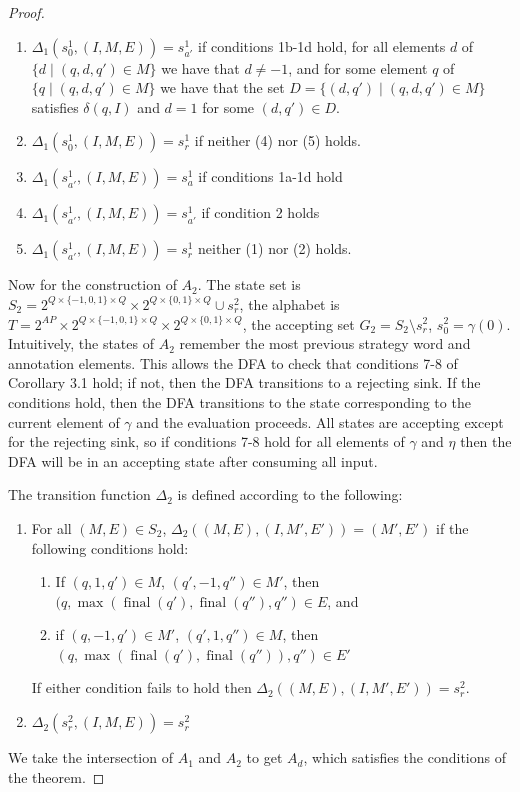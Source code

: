\documentclass{lmcs}
\theoremstyle{definition}
\DeclareMathOperator{\?}{?}
\DeclareMathOperator{\final}{final}
\begin{document}
\begin{proof}
\begin{enumerate}
\item $\Delta_1(s^1_0,(I,M,E)) = s^1_{a'}$ if conditions 1b-1d hold, for all elements $d$ of $\{d \mid (q,d,q') \in M\}$ we have that $d \neq -1$, and for some element $q$ of $\{q \mid (q,d,q') \in M\}$ we have that the set $D=\{(d,q') \mid (q,d,q') \in M\}$ satisfies $\delta(q,I)$ and $d = 1$
for some $(d,q')\in D$.
\item $\Delta_1(s^1_0,(I,M,E)) = s^1_r$ if neither (4) nor (5) holds.
\item $\Delta_1(s^1_{a'},(I,M,E)) = s^1_a$ if conditions 1a-1d hold
\item $\Delta_1(s^1_{a'},(I,M,E)) = s^1_{a'}$ if condition 2 holds
\item $\Delta_1(s^1_{a'},(I,M,E)) = s^1_r$ neither (1) nor (2) holds.
\end{enumerate}

Now for the construction of $A_2$. The state set is $S_2 = 2^{Q \times \{-1,0,1\} \times Q} \times 2^{Q \times \{0,1\} \times Q} \cup s^2_r$, the alphabet is $T = 2^{AP} \times 2^{Q \times \{-1,0,1\} \times Q} \times 2^{Q \times \{0,1\} \times Q}$, the accepting set $G_2 = S_2 \setminus s^2_r$, $s^2_0 = \gamma(0)$. Intuitively, the states of $A_2$ remember the most previous strategy word and annotation elements. This allows the DFA to check that conditions 7-8 of Corollary 3.1 hold; if not, then the DFA transitions to a rejecting sink. If the conditions hold, then the DFA transitions to the state corresponding to the current element of $\gamma$ and the evaluation proceeds. All states are accepting except for the rejecting sink, so if conditions 7-8 hold for all elements of $\gamma$ and $\eta$ then the DFA will be in an accepting state after consuming all input.

The transition function $\Delta_2$ is defined according to the following:
\begin{enumerate}
\item For all $(M,E) \in S_2$,
$\Delta_2((M,E),(I,M',E')) = (M',E')$ if the following conditions hold:
\begin{enumerate}
\item
If $(q,1,q') \in M$, $(q',-1,q'') \in M'$, then $(q,\max(\final(q'),\final(q''),q'') \in E$, and

\item
if $(q,-1,q') \in M'$, $(q',1,q'') \in M$,
then $(q,\max(\final(q'),\final(q'')),q'') \in E'$

\end{enumerate}
If either condition fails to hold then $\Delta_2((M,E),(I,M',E')) = s^2_r$.

\item $\Delta_2(s^2_r,(I,M,E))=s^2_r$
    \end{enumerate}

We take the intersection of $A_1$ and $A_2$ to get $A_d$, which satisfies the conditions of the theorem.
\end{proof}
\end{document}
